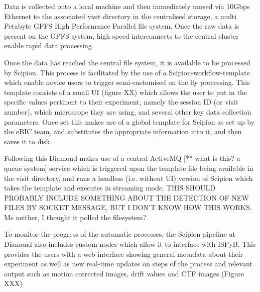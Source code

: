 Data is collected onto a local machine %
and then immediately moved via 10Gbps Ethernet to the associated visit directory in the centralised storage, a multi Petabyte GPFS High Performance Parallel file system.  Once the raw data is present on the GPFS system, high speed interconnects to the central cluster enable rapid data processing. %

Once the data has reached the central file system, it is available to be processed by Scipion.  This process is facilitated by the use of a Scipion-workflow-template which enable novice users to trigger semi-customised on the fly processing. This template consists of a small UI (figure XX) which allows the user to put in the specific values pertinent to their experiment, namely the session ID (or visit number), which microscope they are using, and several other key data collection parameters.  Once set this makes use of a global template for Scipion as set up by the eBIC team, and substitutes the appropriate information into it, and then saves it to disk.

Following this Diamond makes use of a central ActiveMQ [** what is this? a queue system] service which is triggered upon the template file being available in the visit directory, and runs a headless (i.e. without UI) version of Scipion which takes the template and executes in streaming mode.  THIS SHOULD PROBABLY INCLUDE SOMETHING ABOUT THE DETECTION OF NEW FILES BY SOCKET MESSAGE, BUT I DON’T KNOW HOW THIS WORKS. Me neither, I thought it polled the filesystem?


To monitor the progress of the automatic processes, the Scipion pipeline at Diamond also includes custom nodes which allow it to interface with ISPyB.  This provides the users with a web interface showing general metadata about their experiment as well as new real-time updates on steps of the process and relevant output such as motion corrected images, drift values and CTF images (Figure XXX)